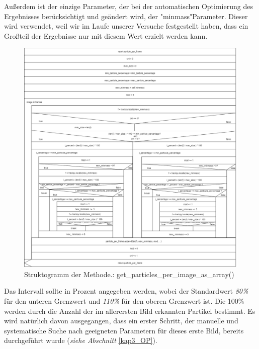 Außerdem ist der einzige Parameter, der bei der automatischen Optimierung des Ergebnisses berücksichtigt und geändert wird, der "minmass"\-Parameter. Dieser wird verwendet, weil wir im Laufe unserer Versuche festgestellt haben, dass ein Großteil der Ergebnisse nur mit diesem Wert erzielt werden kann.


\begin{figure}[H]
  \centering
  \includegraphics[width=1\textwidth]{Grafiken/pts/structogram.png}
  \caption{Struktogramm der Methode.: get\_particles\_per\_image\_as\_array()}
  \label{fig:kap3_strukto_part_per_array}
\end{figure}

Das Intervall sollte in Prozent angegeben werden, wobei der Standardwert \textit{80\%} für den unteren Grenzwert und \textit{110\%} für den oberen Grenzwert ist. Die 100\% werden durch die Anzahl der im allerersten Bild erkannten Partikel bestimmt. 
Es wird natürlich davon ausgegangen, dass ein erster Schritt, der manuelle und systematische Suche nach geeigneten Parametern für dieses erste Bild, bereits durchgeführt wurde (\textit{siehe Abschnitt} \ref{kap3_OP}).\\

